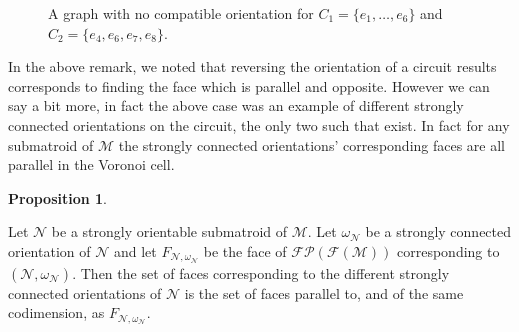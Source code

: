 \documentclass[12pt]{report}
\theoremstyle{definition}
\newtheorem{proposition}[theorem]{Proposition}
\def\calF{\mathcal F}
\def\calM{\mathcal M}
\def\calN{\mathcal N}
\def\calP{\mathcal P}
\theoremstyle{upright}
\begin{document}
\begin{figure}[htbp]

    \begin{center}
    
    
    \end{center}

    \caption{A graph with no compatible orientation for $C_1=\{e_1, \dots, e_6\}$ and $C_2=\{e_4, e_6, e_7, e_8\}$.}\label{fig:NoCompatibleOrientation}

\end{figure}

In the above remark, we noted that reversing the orientation of a circuit results corresponds to finding the face which is parallel and opposite.
However we can say a bit more, in fact the above case was an example of different strongly connected orientations on the circuit, the only two such that exist.
In fact for any submatroid of $\calM$ the strongly connected orientations' corresponding faces are all parallel in the Voronoi cell.

\begin{proposition}\label{prop:ParallelClassCorrespondence}

    Let $\calN$ be a strongly orientable submatroid of $\calM$.
    Let $\omega_\calN$ be a strongly connected orientation of $\calN$ and let $F_{\calN, \omega_\calN}$ be the face of $\calF\calP(\calF(\calM))$ corresponding to $(\calN, \omega_\calN)$.
    Then the set of faces corresponding to the different strongly connected orientations of $\calN$ is the set of faces parallel to, and of the same codimension, as $F_{\calN, \omega_\calN}$.
    
\end{proposition}
\end{document}
